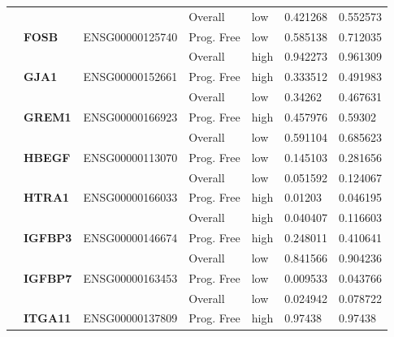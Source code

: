 \begin{spacing}{1}
{\begin{longtable}{|>{\bfseries}p{2cm}|>{\bfseries}p{1.9cm}|p{2.8cm}|p{2cm}|p{2cm}|p{1.5cm}|p{1.5cm}|}
            \hhline{~~~----}
             &          &                 & Overall    & low  & 0.421268 & 0.552573 \\
            \hhline{~======}
             & FOSB     & ENSG00000125740 & Prog. Free & low  & 0.585138 & 0.712035 \\
            \hhline{~~~----}
             &          &                 & Overall    & high & 0.942273 & 0.961309 \\
            \hhline{~======}
            \multirow{2}{3cm}{False}
             & GJA1     & ENSG00000152661 & Prog. Free & high & 0.333512 & 0.491983 \\
            \hhline{~~~----}
             &          &                 & Overall    & low  & 0.34262  & 0.467631 \\
            \hhline{~======}
             & GREM1    & ENSG00000166923 & Prog. Free & high & 0.457976 & 0.59302  \\
            \hhline{~~~----}
             &          &                 & Overall    & low  & 0.591104 & 0.685623 \\
            \hhline{~======}
             & HBEGF    & ENSG00000113070 & Prog. Free & low  & 0.145103 & 0.281656 \\
            \hhline{~~~----}
             &          &                 & Overall    & low  & 0.051592 & 0.124067 \\
            \hhline{~======}
             & HTRA1    & ENSG00000166033 & Prog. Free & high & 0.01203  & 0.046195 \\
            \hhline{~~~----}
             &          &                 & Overall    & high & 0.040407 & 0.116603 \\
            \hhline{~======}
             & IGFBP3   & ENSG00000146674 & Prog. Free & high & 0.248011 & 0.410641 \\
            \hhline{~~~----}
             &          &                 & Overall    & low  & 0.841566 & 0.904236 \\
            \hhline{~======}
             & IGFBP7   & ENSG00000163453 & Prog. Free & low  & 0.009533 & 0.043766 \\
            \hhline{~~~----}
             &          &                 & Overall    & low  & 0.024942 & 0.078722 \\
            \hhline{~======}
             & ITGA11   & ENSG00000137809 & Prog. Free & high & 0.97438  & 0.97438  \\

\end{longtable}}
\end{spacing}
